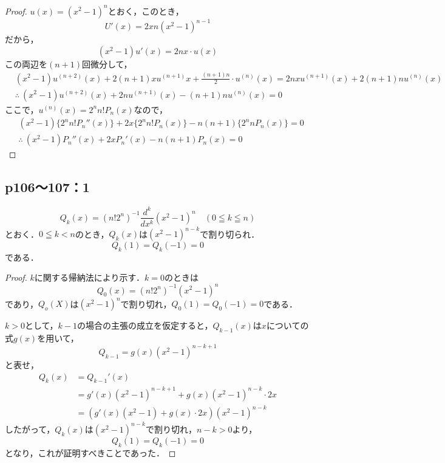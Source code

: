 \documentclass[uplatex,dvipdfmx,a4paper,10pt,fleqn]{jsarticle}
\begin{document}
\begin{tleftbar}
    \begin{proof}
    $u(x)= (x^2-1)^n$とおく，このとき，
    \[
     U'(x)= 2x n(x^2-1)^{n-1}
    \]
    だから，
    \[
        (x^2-1) u'(x)=2nx \cdot u(x)
    \]
    この両辺を$(n+1)$回微分して，
    \begin{align*}
       & (x^2-1)u^{(n+2)}(x)+2(n+1)x u^{(n+1)} x + \frac{(n+1)n}{2} \cdot u^{(n)} (x) = 2nx u^{(n+1)}(x) + 2(n+1) n u^{(n)}(x) \\
       & \therefore ~(x^2-1)u^{(n+2)}(x) + 2n u^{(n+1)}(x)-(n+1)n u^{(n)}(x)=0
    \end{align*}
    ここで，$ u^{(n)} (x)= 2^n n! P_n (x)$なので，
    \begin{align*} 
        & (x^2 -1) \{ 2^n n! P_n ''(x) \} +2x \{ 2^n n! P_n (x) \} -n(n+1) \{ 2^n n P_n(x) \} =0 \\
      &   \therefore ~ (x^2-1) P_n ''(x)+2x P_n '(x) -n(n+1) P_n (x)=0
    \end{align*}
\end{proof}
\end{tleftbar}

\newpage 
\subsection*{p106〜107：1}


    \[
        Q_k (x)= (n! 2^n)^{-1} \frac{d^k}{dx^k} (x^2-1)^n \quad (0 \leqq k \leqq n)
    \]
とおく．$0 \leqq k <n$のとき，$Q_k (x)$は$(x^2-1)^{n-k}$で割り切られ．
\[
    Q_k (1)= Q_k(-1)=0
\]
である．

\begin{proof}
    $k$に関する帰納法により示す．$k=0$のときは
    \[
        Q_0(x)= (n! 2^n)^{-1} (x^2-1)^n
    \]
    であり，$Q_o(X)$は$(x^2-1)^n$で割り切れ，$Q_0(1)=Q_0(-1)=0$である．

    $k>0$として，$k-1$の場合の主張の成立を仮定すると，$Q_{k-1}(x)$は$x$についての式$g(x)$を用いて，
    \[
        Q_{k-1} = g(x)(x^2-1)^{n-k+1}
    \]
    と表せ，
    \begin{align*}
        Q_k (x) & =Q_{k-1}' (x) \\
        &= g'(x)(x^2-1)^{n-k+1} + g(x) (x^2-1)^{n-k} \cdot 2x \\
        &=(g'(x)(x^2-1)+g(x) \cdot 2x) (x^2-1)^{n-k}
    \end{align*}
    したがって，$Q_k(x)$は$(x^2-1)^{n-k}$で割り切れ，$n-k >0$より，
    \[
        Q_k (1)= Q_k(-1)=0
    \]
    となり，これが証明すべきことであった．
\end{proof}
\end{document}
